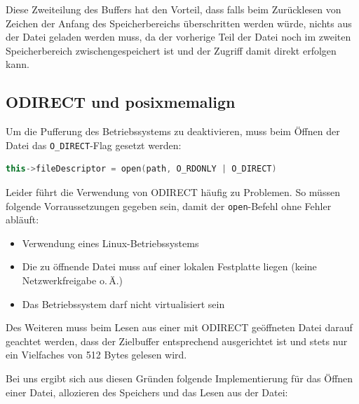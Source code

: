 \documentclass[listof=totoc,DIV11,a4paper]{scrreprt}
\newcommand{\od}{O\textunderscore DIRECT }
\begin{document}
Diese Zweiteilung des Buffers hat den Vorteil, dass falls beim Zurücklesen von Zeichen der Anfang des Speicherbereichs überschritten werden würde, nichts aus der Datei geladen werden muss, da der vorherige Teil der Datei noch im zweiten Speicherbereich zwischengespeichert ist und der Zugriff damit direkt erfolgen kann.

\subsection{\od und posix\textunderscore memalign}\label{subsec:odirect}
Um die Pufferung des Betriebssystems zu deaktivieren, muss beim Öffnen der Datei das \verb+O_DIRECT+-Flag gesetzt werden:
\begin{lstlisting}[language=C++]
this->fileDescriptor = open(path, O_RDONLY | O_DIRECT)
\end{lstlisting}

Leider führt die Verwendung von \od häufig zu Problemen. So müssen folgende Vorraussetzungen gegeben sein, damit der \verb+open+-Befehl ohne Fehler abläuft:
\begin{itemize}
\item Verwendung eines Linux-Betriebssystems
\item Die zu öffnende Datei muss auf einer lokalen Festplatte liegen (keine Netzwerkfreigabe o.\,Ä.)
\item Das Betriebssystem darf nicht virtualisiert sein
\end{itemize}

Des Weiteren muss beim Lesen aus einer mit \od geöffneten Datei darauf geachtet werden, dass der Zielbuffer entsprechend ausgerichtet ist und stets nur ein Vielfaches von 512 Bytes gelesen wird.

Bei uns ergibt sich aus diesen Gründen folgende Implementierung für das Öffnen einer Datei, allozieren des Speichers und das Lesen aus der Datei:
\end{document}
